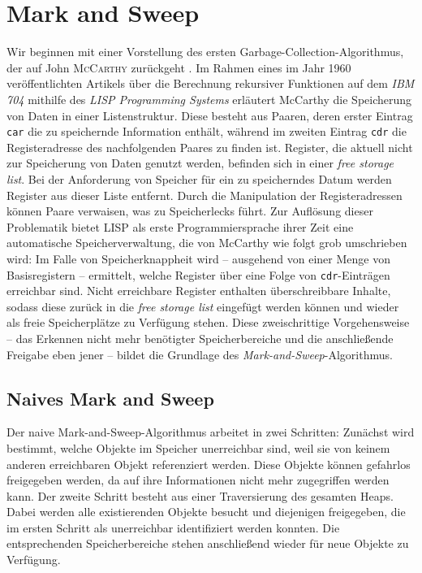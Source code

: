 \chapter{Mark and Sweep}
\label{cha:mark-sweep}
Wir beginnen mit einer Vorstellung des ersten Garbage-Collection-Algorithmus, der auf John \textsc{McCarthy} zurückgeht \cite[191--193]{mccarthy1960}.
Im Rahmen eines im Jahr 1960 veröffentlichten Artikels über die Berechnung rekursiver Funktionen auf dem \textit{IBM 704} mithilfe des \textit{LISP Programming Systems} erläutert McCarthy die Speicherung von Daten in einer Listenstruktur.
Diese besteht aus Paaren, deren erster Eintrag \texttt{car} die zu speichernde Information enthält, während im zweiten Eintrag \texttt{cdr} die Registeradresse des nachfolgenden Paares zu finden ist.
Register, die aktuell nicht zur Speicherung von Daten genutzt werden, befinden sich in einer \textit{free storage list}.
Bei der Anforderung von Speicher für ein zu speicherndes Datum werden Register aus dieser Liste entfernt.
Durch die Manipulation der Registeradressen können Paare verwaisen, was zu Speicherlecks führt.
Zur Auflösung dieser Problematik bietet LISP als erste Programmiersprache ihrer Zeit eine automatische Speicherverwaltung, die von McCarthy wie folgt grob umschrieben wird:
Im Falle von Speicherknappheit wird -- ausgehend von einer Menge von Basisregistern -- ermittelt, welche Register über eine Folge von \texttt{cdr}-Einträgen erreichbar sind.
Nicht erreichbare Register enthalten überschreibbare Inhalte, sodass diese zurück in die \textit{free storage list} eingefügt werden können und wieder als freie Speicherplätze zu Verfügung stehen.
Diese zweischrittige Vorgehensweise -- das Erkennen nicht mehr benötigter Speicherbereiche und die anschließende Freigabe eben jener -- bildet die Grundlage des \textit{Mark-and-Sweep}-Algorithmus.

\section{Naives Mark and Sweep}
\label{sec:naive-mark-sweep}
Der naive Mark-and-Sweep-Algorithmus arbeitet in zwei Schritten:
Zunächst wird bestimmt, welche Objekte im Speicher unerreichbar sind, weil sie von keinem anderen erreichbaren Objekt referenziert werden.
Diese Objekte können gefahrlos freigegeben werden, da auf ihre Informationen nicht mehr zugegriffen werden kann.
Der zweite Schritt besteht aus einer Traversierung des gesamten Heaps.
Dabei werden alle existierenden Objekte besucht und diejenigen freigegeben, die im ersten Schritt als unerreichbar identifiziert werden konnten.
Die entsprechenden Speicherbereiche stehen anschließend wieder für neue Objekte zu Verfügung.

